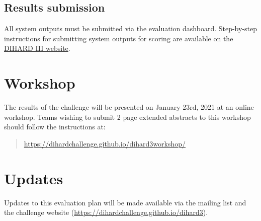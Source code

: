 \documentclass{article}
\begin{document}
\subsection{Results submission}
All system outputs must be submitted via the evaluation dashboard. Step-by-step instructions for submitting system outputs for scoring are available on  the \href{https://dihardchallenge.github.io/dihard3/submission.html}{DIHARD III website}.


\section{Workshop}
The results of the challenge will be presented on January 23rd, 2021 at an online workshop. Teams wishing to submit 2 page extended abstracts to this workshop should follow the instructions at:
    \begin{quote}
        \url{https://dihardchallenge.github.io/dihard3workshop/}
    \end{quote}



\section{Updates}
Updates to this evaluation plan will be made available via the mailing list and the challenge website (\url{https://dihardchallenge.github.io/dihard3}).
\end{document}
